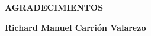 \newpage
\vspace*{\fill}
\begin{flushright}
	\footnotesize
	\begin{minipage}{0.5\textwidth}
		\begin{flushright}
			\uppercase{\textbf{Agradecimientos}}
		\end{flushright}
		\itshape


		\bigbreak
		\begin{flushright}
			\textbf{Richard Manuel Carrión Valarezo}
		\end{flushright}
	\end{minipage}
\end{flushright}
\vspace*{\fill}
